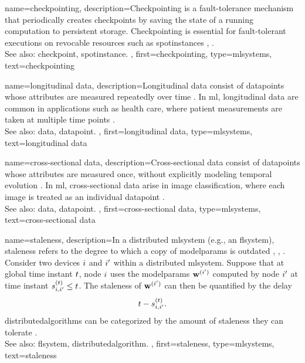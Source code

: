 {name={checkpointing},
	description={Checkpointing is a fault-tolerance mechanism
		that periodically creates \glspl{checkpoint} by saving the \gls{state} 
		of a running computation to persistent storage. Checkpointing is essential 
		for fault-tolerant executions on revocable resources
		such as \glspl{spotinstance} \cite{Elnozahy2002}, \cite{Mazzucco2011}.
		\\
		See also: \gls{checkpoint}, \gls{spotinstance}. },
	first={checkpointing},
	type=mlsystems,
	text={checkpointing}
}

{name={longitudinal data},
	description={Longitudinal \gls{data} consist of \glspl{datapoint} 
		whose attributes are measured repeatedly over time \cite{fitzmaurice2011applied}. 
		In \gls{ml}, longitudinal \gls{data} are common in applications such 
		as health care, where patient measurements are taken at multiple time points \cite{Mallinckrodt:2017aa}.
		\\
		See also: \gls{data}, \gls{datapoint}. }, 
	first={longitudinal data},
	type=mlsystems,
	text={longitudinal data}
}

{name={cross-sectional data},
	description={Cross-sectional \gls{data} consist of 
		\glspl{datapoint} whose attributes are measured once, without explicitly 
		modeling temporal evolution \cite{Wooldridge2025}. In \gls{ml}, 
		cross-sectional \gls{data} arise in image classification, 
		where each image is treated as an individual \gls{datapoint} \cite{hastie01statisticallearning}.
		\\
		See also: \gls{data}, \gls{datapoint}. },
	first={cross-sectional data},
	type=mlsystems,
	text={cross-sectional data}
}

{name={staleness},
	description={In a distributed \gls{mlsystem} (e.g., an \gls{flsystem}), staleness refers to 
		the degree to which a copy of \glspl{modelparam} is outdated 
		\cite{ParallelDistrBook}, \cite{JungFLBook}, \cite{Coulouris2012}. 
		Consider two \glspl{device} $i$ and $i'$ within a distributed \gls{mlsystem}. 
		Suppose that at global time instant $t$, node $i$ uses the \glspl{modelparam} 
		$\mathbf{w}^{(i')}$ computed by node $i'$ at time instant 
		$s^{(t)}_{i,i'} \le t$. The staleness of $\mathbf{w}^{(i')}$ 
		can then be quantified by the delay 
		\[
			t -s^{(t)}_{i,i'}.
		\]
		\Glspl{distributedalgorithm} can be categorized by the amount 
		of staleness they can tolerate \cite{ParallelDistrBook}. 
		\\
		See also: \gls{flsystem}, \gls{distributedalgorithm}. },
	first={staleness},
	type=mlsystems,
	text={staleness}
}


